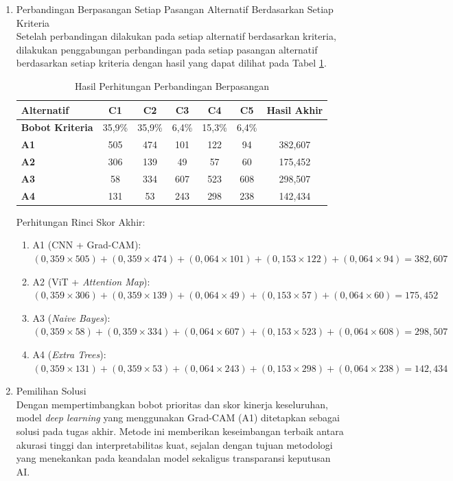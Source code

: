 \begin{enumerate}
	\item Perbandingan Berpasangan Setiap Pasangan Alternatif Berdasarkan Setiap Kriteria \\
	Setelah perbandingan dilakukan pada setiap alternatif berdasarkan kriteria, dilakukan penggabungan perbandingan pada setiap pasangan alternatif berdasarkan setiap kriteria dengan hasil yang dapat dilihat pada Tabel \ref{tab:hasil_perhitungan}.
	\begin{table}[h]
		\centering
		\caption{Hasil Perhitungan Perbandingan Berpasangan}
		\label{tab:hasil_perhitungan}
		\begin{tabular}{|l|c|c|c|c|c|c|}
			\hline
			\textbf{Alternatif} & \textbf{C1} & \textbf{C2} & \textbf{C3} & \textbf{C4} & \textbf{C5} & \textbf{Hasil Akhir} \\ \hline
			\textbf{Bobot Kriteria} & 35,9\% & 35,9\% & 6,4\% & 15,3\% & 6,4\% & \\ \hline
			\textbf{A1} & 505 & 474 & 101 & 122 & 94 & 382,607 \\ \hline
			\textbf{A2} & 306 & 139 & 49 & 57 & 60 & 175,452 \\ \hline
			\textbf{A3} & 58 & 334 & 607 & 523 & 608 & 298,507 \\ \hline
			\textbf{A4} & 131 & 53 & 243 & 298 & 238 & 142,434 \\ \hline
		\end{tabular}
	\end{table}
	
	Perhitungan Rinci Skor Akhir:
	\begin{enumerate}
		\item A1 (CNN + Grad-CAM): $(0,359 \times 505) + (0,359 \times 474) + (0,064 \times 101) + (0,153 \times 122) + (0,064 \times 94) = 382,607$
		\item A2 (ViT + \textit{Attention Map}): $(0,359 \times 306) + (0,359 \times 139) + (0,064 \times 49) + (0,153 \times 57) + (0,064 \times 60) = 175,452$
		\item A3 (\textit{Naive Bayes}): $(0,359 \times 58) + (0,359 \times 334) + (0,064 \times 607) + (0,153 \times 523) + (0,064 \times 608) = 298,507$
		\item A4 (\textit{Extra Trees}): $(0,359 \times 131) + (0,359 \times 53) + (0,064 \times 243) + (0,153 \times 298) + (0,064 \times 238) = 142,434$
	\end{enumerate}
	\item Pemilihan Solusi \\
	Dengan mempertimbangkan bobot prioritas dan skor kinerja keseluruhan, model \textit{deep learning} yang menggunakan Grad-CAM (A1) ditetapkan sebagai solusi pada tugas akhir. Metode ini memberikan keseimbangan terbaik antara akurasi tinggi dan interpretabilitas kuat, sejalan dengan tujuan metodologi yang menekankan pada keandalan model sekaligus transparansi keputusan AI.
\end{enumerate}